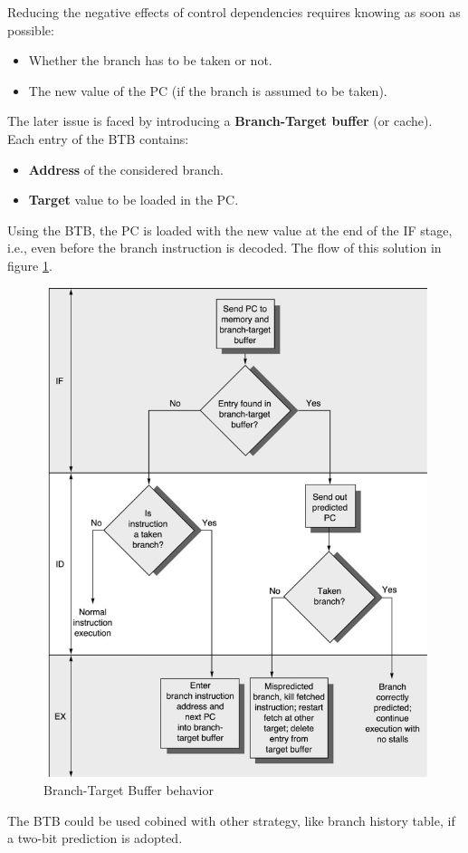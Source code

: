 \documentclass[12pt]{article}
\begin{document}
Reducing the negative effects of control dependencies requires knowing as soon as possible:
\begin{itemize}
  \item Whether the branch has to be taken or not.
  \item The new value of the PC (if the branch is assumed to be taken).
\end{itemize}
The later issue is faced by introducing a \textbf{Branch-Target buffer} (or cache). Each entry of the BTB contains:
\begin{itemize}
  \item \textbf{Address} of the considered branch.
  \item \textbf{Target} value to be loaded in the PC.
\end{itemize}
Using the BTB, the PC is loaded with the new value at the end of the IF stage, i.e., even before the branch instruction is decoded. The flow of this solution in figure \ref{fig:btb}.
\begin{figure}[h!]
  \centering
  \includegraphics[width=\linewidth]{images/btb.png}
  \caption{Branch-Target Buffer behavior}
  \label{fig:btb}
\end{figure}
The BTB could be used cobined with other strategy, like branch history table, if a two-bit prediction is adopted.
\end{document}
